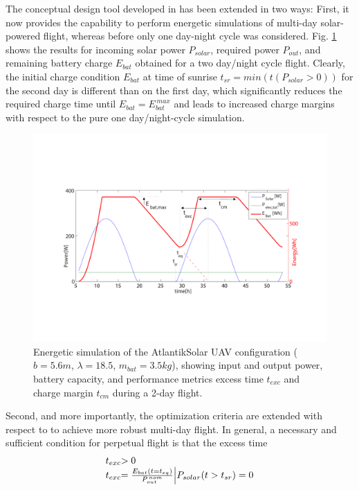 \label{sec:ExtensionOptCriteria}
The conceptual design tool developed in \cite{Noth_PhD,Leutenegger_JIRS} has been extended in two ways: First, it now provides the capability to perform energetic simulations of multi-day solar-powered flight, whereas before only one day-night cycle was considered. Fig. \ref{fig:EnergySimulation} shows the results for incoming solar power $P_{solar}$, required power $P_{out}$, and remaining battery charge $E_{bat}$ obtained for a two day/night cycle flight. Clearly, the initial charge condition $E_{bat}$ at time of sunrise $t_{sr}=min(t(P_{solar}>0))$ for the second day is different than on the first day, which significantly reduces the required charge time until $E_{bat}=E_{bat}^{\,max}$ and leads to increased charge margins with respect to the pure one day/night-cycle simulation. %
\begin{figure}[tb]
    \centering
    \includegraphics[width=\linewidth]{images/2_EnergySimulation.pdf}
    \caption{Energetic simulation of the AtlantikSolar UAV configuration ($b=5.6m$, $\lambda=18.5$, $m_{bat}=3.5kg$), showing input and output power, battery capacity, and performance metrics excess time $t_{exc}$ and charge margin $t_{cm}$ during a 2-day flight.}
    \label{fig:EnergySimulation}
\end{figure}
Second, and more importantly, the optimization criteria are extended with respect to \cite{Noth_PhD,Leutenegger_JIRS} to achieve more robust multi-day flight. In general, a necessary and sufficient condition for perpetual flight is that the excess time
\begin{equation} \label{eqn:t_exc}
\begin{array}{r@{}l}
t_{exc}&>0\\
t_{exc}&=\frac{E_{bat}(t=t_{eq})}{P_{out}^{\,nom}} \Big| P_{solar}(t>t_{sr})=0
\end{array}
\end{equation}
